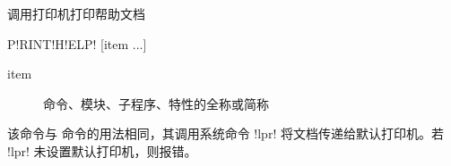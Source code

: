 \label{cmd:printhelp}

调用打印机打印帮助文档

\begin{SACSTX}
P!RINT!H!ELP! [item ...]
\end{SACSTX}

\begin{description}
\item [item] 命令、模块、子程序、特性的全称或简称
\end{description}

该命令与  命令的用法相同，其调用系统命令 !lpr!
将文档传递给默认打印机。若 !lpr! 未设置默认打印机，则报错。
